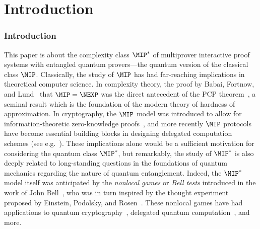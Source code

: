 \documentclass[11pt]{article}
\begin{document}

\newpage

\tableofcontents
\vfill
\thispagestyle{empty}
\newpage


\part{Introduction}


\section{Introduction}  \label{sec:intro}

This paper is about the complexity class $\MIP^*$ of multiprover interactive proof systems with
entangled quantum provers---the quantum version of the classical class
$\MIP$. Classically, the study of $\MIP$ has had far-reaching
implications in theoretical computer science. In complexity theory, the proof by
Babai, Fortnow, and Lund~\cite{BFL91} that $\MIP = \NEXP$ was the
direct antecedent of the PCP theorem~\cite{ALM+98,AS98}, a seminal
result which is the foundation of the modern theory of hardness of approximation. In cryptography, the $\MIP$ model was introduced
to allow for information-theoretic zero-knowledge proofs~\cite{BGKW88}, and more recently $\MIP$ protocols have become essential building blocks
in designing delegated computation schemes (see e.g.~\cite{KRR14}). These implications alone
would be a sufficient motivation for considering the quantum class
$\MIP^*$, but remarkably, the study of $\MIP^*$ is also deeply related to
long-standing questions in the foundations of quantum
mechanics regarding the nature of quantum entanglement. Indeed, the
$\MIP^*$ model itself was anticipated by the \emph{nonlocal games} or
\emph{Bell tests} introduced in the
work of John Bell~\cite{Bel64}, who was in turn inspired by the thought
experiment proposed by Einstein, Podolsky, and Rosen~\cite{EPR35}.
These nonlocal games have had applications to quantum
cryptography~\cite{Eke91, MY98, Col06}, delegated quantum
computation~\cite{RUV13}, and more.
\end{document}
